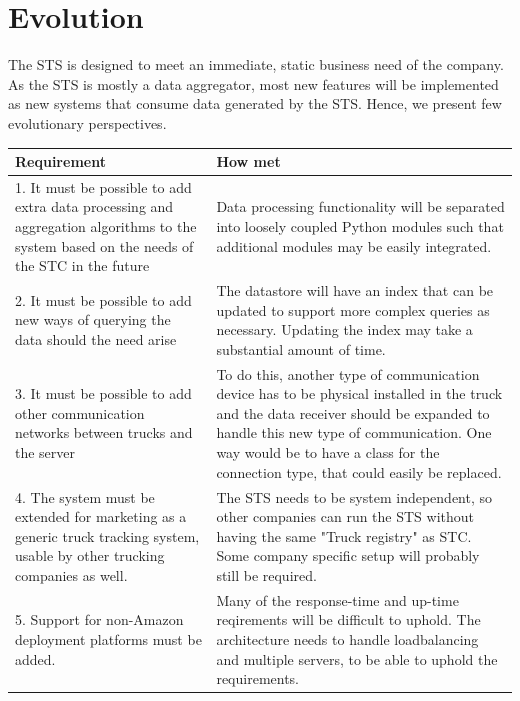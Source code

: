 \documentclass[a4paper,11pt]{report}
\begin{document}
\section{Evolution}
\label{sec:evolution}

The STS is designed to meet an immediate, static business need of the
company.  As the STS is mostly a data aggregator, most new features
will be implemented as new systems that consume data generated by the
STS.  Hence, we present few evolutionary perspectives.

\begin{center}
  \begin{tabular}[h!]{| p{} | p{} |}
    \hline
    \rowcolor{gray}
    Requirement & How met \\
    \hline
    \hline
    1. It must be possible to add extra data processing and aggregation
    algorithms to the system based on the needs of the STC in the future &
    Data processing functionality will be separated into loosely coupled Python
    modules such that additional modules may be easily integrated. \\
    \hline
    2. It must be possible to add new ways of querying the data should the need
    arise & The datastore will have an index that can be updated to support more
    complex queries as necessary. Updating the index may take a substantial amount
    of time. \\
    \hline
    3. It must be possible to add other communication networks between trucks and the server & To do this, another type of communication device has to be physical installed in the truck and the data receiver should be expanded to handle this new type of communication. One way would be to have a class for the connection type, that could easily be replaced. \\
    \hline
    4.  The system must be extended for marketing as a generic truck tracking system, usable by other trucking companies as well. & The STS needs to be system independent, so other companies can run the STS without having the same "Truck registry" as STC. Some company specific setup will probably still be required. \\
    \hline
    5. Support for non-Amazon deployment platforms must be added. & Many of the response-time and up-time reqirements will be difficult to uphold. The architecture needs to handle loadbalancing and multiple servers, to be able to uphold the requirements. \\
    \hline
 \end{tabular}
\end{center}
\end{document}
